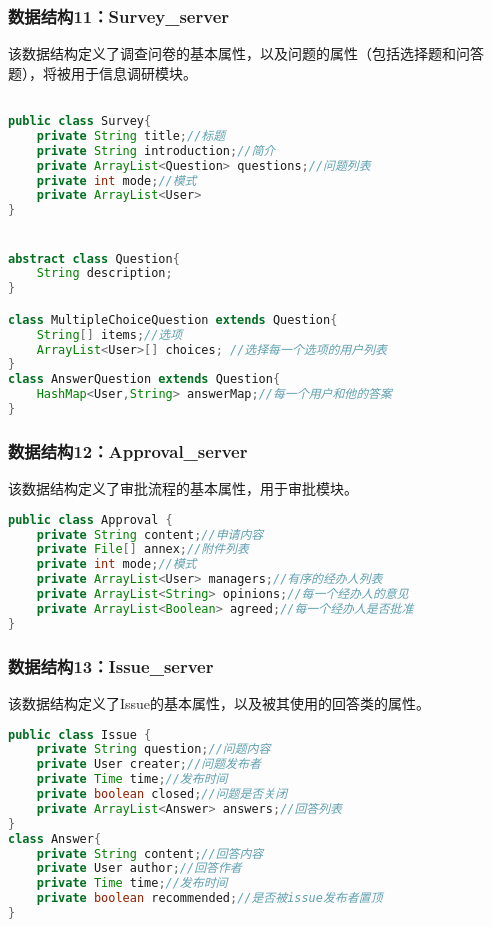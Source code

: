 {\color{red}

\subsubsection{\color{red} 数据结构11：Survey\_server}
该数据结构定义了调查问卷的基本属性，以及问题的属性（包括选择题和问答题），将被用于信息调研模块。
\begin{lstlisting}[language=Java, caption=Survey定义]

public class Survey{
    private String title;//标题
    private String introduction;//简介
    private ArrayList<Question> questions;//问题列表
    private int mode;//模式
    private ArrayList<User>  
}


abstract class Question{
    String description;
}

class MultipleChoiceQuestion extends Question{
    String[] items;//选项
    ArrayList<User>[] choices; //选择每一个选项的用户列表
}
class AnswerQuestion extends Question{
    HashMap<User,String> answerMap;//每一个用户和他的答案
}
\end{lstlisting}

\subsubsection{\color{red} 数据结构12：Approval\_server}
该数据结构定义了审批流程的基本属性，用于审批模块。
\begin{lstlisting}[language=Java, caption=Approval定义]
public class Approval {
    private String content;//申请内容
    private File[] annex;//附件列表
    private int mode;//模式
    private ArrayList<User> managers;//有序的经办人列表
    private ArrayList<String> opinions;//每一个经办人的意见
    private ArrayList<Boolean> agreed;//每一个经办人是否批准
}
\end{lstlisting}

\subsubsection{\color{red} 数据结构13：Issue\_server}
该数据结构定义了Issue的基本属性，以及被其使用的回答类的属性。

\begin{lstlisting}[language=Java, caption=Issue定义]
public class Issue {
    private String question;//问题内容
    private User creater;//问题发布者
    private Time time;//发布时间
    private boolean closed;//问题是否关闭
    private ArrayList<Answer> answers;//回答列表
}
class Answer{
    private String content;//回答内容
    private User author;//回答作者
    private Time time;//发布时间
    private boolean recommended;//是否被issue发布者置顶
}
\end{lstlisting}
}

